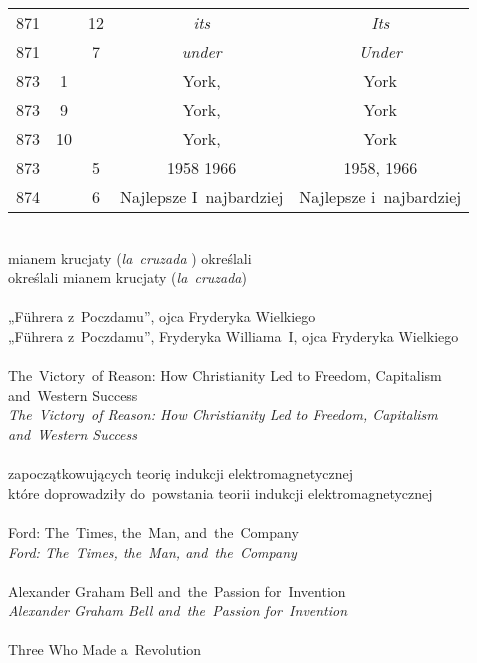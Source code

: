 \documentclass[a4paper,11pt]{article}
\begin{document}
\begin{center}
\begin{tabular}{|c|c|c|c|c|}
    871 & & 12 & \emph{its} & \emph{Its} \\
    871 & &  7 & \emph{under} & \emph{Under} \\
    873 &  1 & & York, & York \\
    873 &  9 & & York, & York \\
    873 & 10 & & York, & York \\
    873 & &  5 & 1958 1966 & 1958, 1966 \\
    874 & &  6 & Najlepsze I~najbardziej & Najlepsze i~najbardziej \\
    \hline
  \end{tabular}

\end{center}


\noindent
{} \\
\Jest mianem krucjaty (\emph{la~cruzada} ) określali \\
\Powin  określali mianem krucjaty (\emph{la~cruzada}) \\
 \\
\Jest „F\"{u}hrera z~Poczdamu”, ojca Fryderyka Wielkiego \\
\Powin „F\"{u}hrera z~Poczdamu”, Fryderyka Williama~I, ojca Fryderyka
Wielkiego \\
 \\
\Jest The~Victory~of Reason: How Christianity Led to Freedom,
Capitalism and~Western Success \\
\Powin \emph{The~Victory~of Reason: How Christianity Led to Freedom,
  Capitalism and~Western Success} \\
 \\
\Jest zapoczątkowujących teorię indukcji elektromagnetycznej \\
\Powin które doprowadziły do~powstania teorii indukcji
elektromagnetycznej
\\
 \\
\Jest Ford: The~Times, the~Man, and~the~Company \\
\Powin \emph{Ford: The~Times, the~Man, and~the~Company} \\
 \\
\Jest Alexander Graham Bell and~the~Passion for~Invention \\
\Powin \emph{Alexander Graham Bell and~the~Passion for~Invention} \\
 \\
\Jest Three Who Made a~Revolution \\
\end{document}
